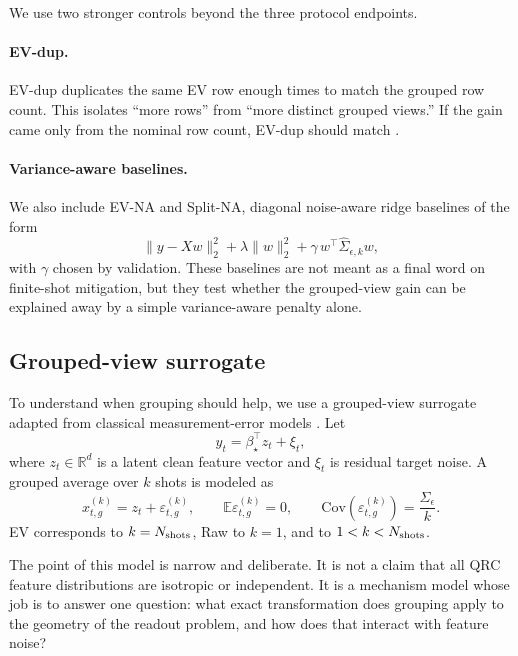We use two stronger controls beyond the three protocol endpoints.

\paragraph*{EV-dup.}
EV-dup duplicates the same EV row enough times to match the grouped row count. This isolates ``more rows'' from ``more distinct grouped views.'' If the gain came only from the nominal row count, EV-dup should match \Split{}.

\paragraph*{Variance-aware baselines.}
We also include EV-NA and Split-NA, diagonal noise-aware ridge baselines of the form
\begin{equation}
\|y-Xw\|_2^2 + \lambda \|w\|_2^2 + \gamma\, w^\top \widehat{\Sigma}_{\epsilon,k} w,
\label{eq:noiseaware}
\end{equation}
with $\gamma$ chosen by validation. These baselines are not meant as a final word on finite-shot mitigation, but they test whether the grouped-view gain can be explained away by a simple variance-aware penalty alone.

\subsection{Grouped-view surrogate}

To understand when grouping should help, we use a grouped-view surrogate adapted from classical measurement-error models \cite{fuller1987measurement,carroll2006measurement}. Let
\begin{equation}
y_t = \beta_\star^\top z_t + \xi_t,
\label{eq:latent}
\end{equation}
where $z_t\in\mathbb{R}^d$ is a latent clean feature vector and $\xi_t$ is residual target noise. A grouped average over $k$ shots is modeled as
\begin{equation}
x_{t,g}^{(k)} = z_t + \varepsilon_{t,g}^{(k)}, \qquad
\mathbb{E}\varepsilon_{t,g}^{(k)}=0, \qquad
\mathrm{Cov}(\varepsilon_{t,g}^{(k)})=\frac{\Sigma_\epsilon}{k}.
\label{eq:groupedview}
\end{equation}
EV corresponds to $k=N_{\mathrm{shots}}$, Raw to $k=1$, and \Split{} to $1<k<N_{\mathrm{shots}}$.

The point of this model is narrow and deliberate. It is not a claim that all QRC feature distributions are isotropic or independent. It is a mechanism model whose job is to answer one question: what exact transformation does grouping apply to the geometry of the readout problem, and how does that interact with feature noise?

